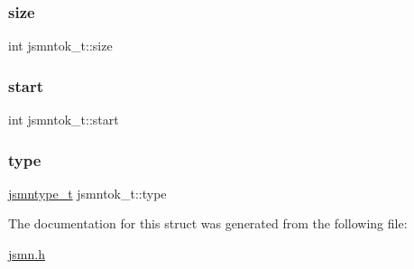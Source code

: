 \subsubsection{\texorpdfstring{size}{size}}
{\footnotesize\ttfamily int jsmntok\+\_\+t\+::size}

\mbox{\label{structjsmntok__t_a0a8f55d0095f268ce8e224fe1234acd0}} 
\subsubsection{\texorpdfstring{start}{start}}
{\footnotesize\ttfamily int jsmntok\+\_\+t\+::start}

\mbox{\label{structjsmntok__t_ac03dbd6b83cbcd979eb64702d5b9943e}} 
\subsubsection{\texorpdfstring{type}{type}}
{\footnotesize\ttfamily \hyperlink{jsmn_8h_a065320719769f9dc1fbe30094e52802f}{jsmntype\+\_\+t} jsmntok\+\_\+t\+::type}



The documentation for this struct was generated from the following file\+:\begin{DoxyCompactItemize}
\item 
\hyperlink{jsmn_8h}{jsmn.\+h}\end{DoxyCompactItemize}
